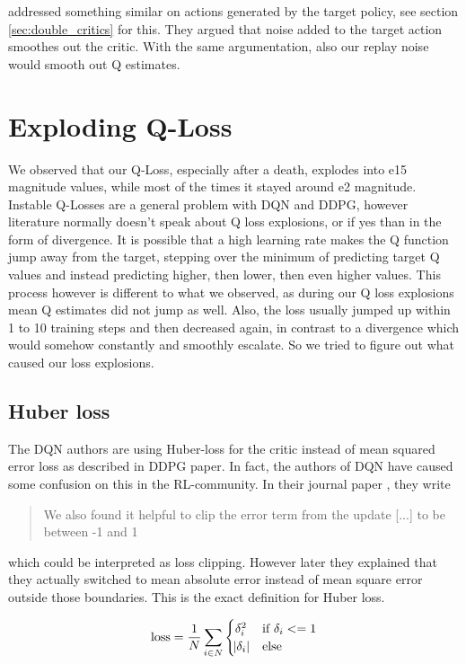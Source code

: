 \documentclass[hyperref,final,beleg]{cgvpub}
\begin{document}
\cite{fujimotoAddressingFunctionApproximation2018} addressed something similar on actions generated by the target policy, see section \ref{sec:double_critics} for this. They argued that noise added to the target action smoothes out the critic. With the same argumentation, also our replay noise would smooth out Q estimates.

\section{Exploding Q-Loss}

We observed that our Q-Loss, especially after a death, explodes into e15 magnitude values, while most of the times it stayed around e2 magnitude. Instable Q-Losses are a general problem with DQN and DDPG, however literature normally doesn't speak about Q loss explosions, or if yes than in the form of divergence. It is possible that a high learning rate makes the Q function jump away from the target, stepping over the minimum of predicting target Q values and instead predicting higher, then lower, then even higher values. This process however is different to what we observed, as during our Q loss explosions mean Q estimates did not jump as well. Also, the loss usually jumped up within 1 to 10 training steps and then decreased again, in contrast to a divergence which would somehow constantly and smoothly escalate. So we tried to figure out what caused our loss explosions.

\subsection{Huber loss}
The \ac{DQN} authors are using Huber-loss \cite{Huber1964} for the critic instead of mean squared error loss as described in DDPG paper. In fact, the authors of \ac{DQN} have caused some confusion on this in the \ac{RL}-community. In their journal paper \cite{mnihHumanlevelControlDeep2015}, they write 
\begin{quotation}
We also found it helpful to clip the error term from the update [...] to be between -1 and 1
\end{quotation}
which could be interpreted as loss clipping. However later they explained that they actually switched to mean absolute error instead of mean square error outside those boundaries.  This is the exact definition for Huber loss.

\begin{equation}
\text{loss} = \frac{1}{N}\sum_{i \in N}\begin{cases} \delta_i^2& \text{if } \delta_i <= 1\\ \abs{\delta_i} & \text{else}\end{cases}
\end{equation}
\end{document}
